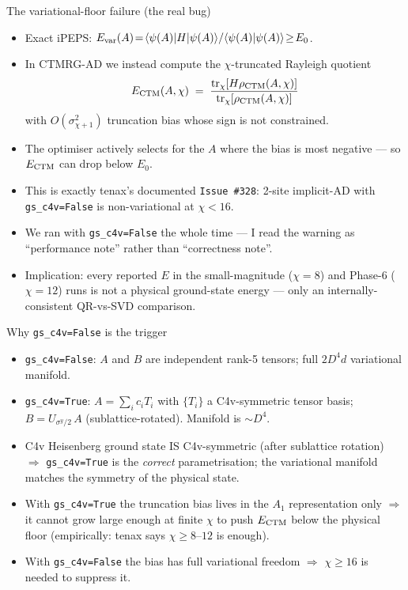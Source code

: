 \documentclass[11pt,aspectratio=169]{beamer}
\begin{document}
\begin{frame}{The variational-floor failure (the real bug)}
  \begin{itemize}
    \item Exact iPEPS: $E_{\rm var}(A) \!=\! \langle\psi(A)|H|\psi(A)\rangle / \langle\psi(A)|\psi(A)\rangle \!\ge\! E_0$.
    \item In CTMRG-AD we instead compute the \alert{$\chi$-truncated Rayleigh quotient}
      \[
        E_{\rm CTM}(A,\chi) \;=\; \frac{\mathrm{tr}_\chi[H\rho_{\rm CTM}(A,\chi)]}{\mathrm{tr}_\chi[\rho_{\rm CTM}(A,\chi)]}
      \]
      with $O(\sigma_{\chi+1}^2)$ truncation bias whose \alert{sign is not constrained}.
    \pause
    \item The optimiser \alert{actively selects} for the $A$ where the bias is most negative --- so $E_{\rm CTM}$ can drop below $E_0$.
    \item This is exactly tenax's documented \texttt{Issue \#328}: 2-site implicit-AD with \texttt{gs\_c4v=False} is non-variational at $\chi<16$.
    \item \alert{We ran with \texttt{gs\_c4v=False} the whole time} --- I read the warning as ``performance note'' rather than ``correctness note''.
    \item Implication: every reported $E$ in the small-magnitude (\alert{$\chi=8$}) and Phase-6 (\alert{$\chi=12$}) runs is \alert{not a physical ground-state energy} --- only an internally-consistent QR-vs-SVD comparison.
  \end{itemize}
\end{frame}

\begin{frame}{Why \texttt{gs\_c4v=False} is the trigger}
  \begin{itemize}
    \item \texttt{gs\_c4v=False}: $A$ and $B$ are \alert{independent} rank-5 tensors; full $2 D^4 d$ variational manifold.
    \item \texttt{gs\_c4v=True}: $A = \sum_i c_i T_i$ with $\{T_i\}$ a C4v-symmetric tensor basis; $B = U_{\sigma^y/2}\,A$ (sublattice-rotated). Manifold is $\sim D^4$.
    \pause
    \item C4v Heisenberg ground state IS C4v-symmetric (after sublattice rotation) $\Rightarrow$ \texttt{gs\_c4v=True} is the \emph{correct} parametrisation; the variational manifold matches the symmetry of the physical state.
    \item With \texttt{gs\_c4v=True} the truncation bias lives in the $A_1$ representation only $\Rightarrow$ it cannot grow large enough at finite $\chi$ to push $E_{\rm CTM}$ below the physical floor (empirically: tenax says $\chi\!\ge\!8\text{--}12$ is enough).
    \item With \texttt{gs\_c4v=False} the bias has full variational freedom $\Rightarrow$ $\chi\!\ge\!16$ is needed to suppress it.
  \end{itemize}
\end{frame}
\end{document}
